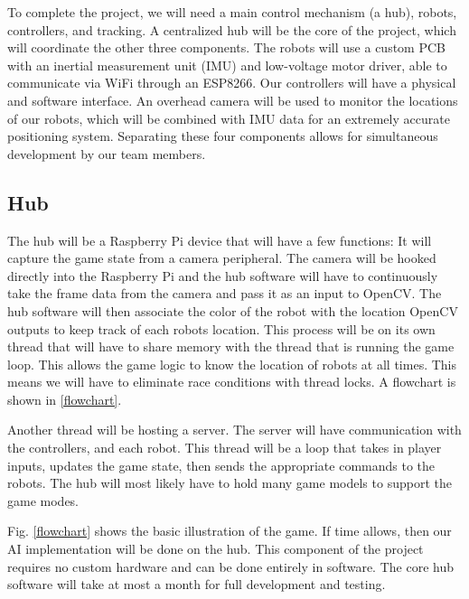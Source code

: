 \documentclass[11pt]{ieeeconf}
\begin{document}
To complete the project, we will need a main control mechanism (a hub), robots, controllers, and tracking. A centralized hub will be the core of the project, which will coordinate the other three components. The robots will use a custom PCB with an inertial measurement unit (IMU) and low-voltage motor driver, able to communicate via WiFi through an ESP8266. Our controllers will have a physical and software interface. An overhead camera will be used to monitor the locations of our robots, which will be combined with IMU data for an extremely accurate positioning system. Separating these four components allows for simultaneous development by our team members.

\subsection{Hub}
The hub will be a Raspberry Pi device that will have a few functions:
It will capture the game state from a camera peripheral. The camera will be hooked directly into the Raspberry Pi and the hub software will have to continuously take the frame data from the camera and pass it as an input to OpenCV. The hub software will then associate the color of the robot with the location OpenCV outputs to keep track of each robots location. This process will be on its own thread that will have to share memory with the thread that is running the game loop. This allows the game logic to know the location of robots at all times. This means we will have to eliminate race conditions with thread locks. A flowchart is shown in \ref{flowchart}.

Another thread will be hosting a server. The server will have communication with the controllers, and each robot. This thread will be a loop that takes in player inputs, updates the game state, then sends the appropriate commands to the robots. The hub will most likely have to hold many game models to support the game modes.

Fig. \ref{flowchart} shows the basic illustration of the game. If time allows, then our AI implementation will be done on the hub. This component of the project requires no custom hardware and can be done entirely in software. The core hub software will take at most a month for full development and testing. 
\end{document}
